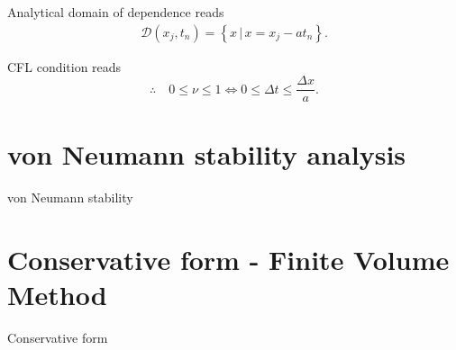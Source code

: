 \documentclass[12pt]{article}
\begin{document}
Analytical domain of dependence reads
\begin{align}
	\mathcal{D}\left(x_j,t_n\right)
	=  \left\{ x \, \Big|\, x = x_{j} - at_n \right\} .
\end{align}

CFL condition reads
\begin{equation}
	\therefore\quad
	\boxed{
		0 \leq \nu \leq 1
		\Leftrightarrow 
		0 \leq \Delta t \leq \frac{\Delta x}{a}.
	}
\end{equation}

\pagebreak
\section{von Neumann stability analysis}
\begin{example}
	von Neumann stability
\end{example}

\pagebreak
\section{Conservative form -  Finite Volume Method}
\begin{example}
	Conservative form 
\end{example}




\end{document}

